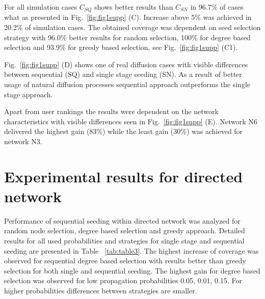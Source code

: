 \documentclass[11pt]{article} %
\begin{document}
For all simulation cases $C_{SQ}$ shows better results than $C_{SN}$ in 96.7\% of cases what as presented in Fig.~\ref{fig:fig1supp} (C). Increase above 5\% was achieved in 20.2\% of simulation cases. The obtained coverage was  dependent on seed selection strategy with 96.0\% better results for random selection, 100\% for degree based selection and 93.9\% for greedy based selection, see Fig.~\ref{fig:fig1supp} (C1). 

Fig.~\ref{fig:fig1supp} (D) shows one of real diffusion cases with visible differences between sequential (SQ) and single stage seeding (SN). As a result of better usage of natural diffusion processes sequential approach  outperforms the single stage approach.

Apart from user rankings the results were dependent on the network characteristics with visible differences seen in Fig.~\ref{fig:fig1supp} (E). Network N6 delivered the highest gain (83\%) while the least gain (30\%) was achieved for network N3.

\section*{Experimental results for directed network}

Performance of sequential seeding within directed network was analyzed for random node selection, degree based selection and greedy approach. Detailed results for all used probabilities and strategies for single stage and sequential seeding are presented in Table ~\ref{tab:table3}. The highest increase of coverage was observed for sequential degree based selection with results better than greedy selection for both single and sequential seeding. The highest gain for degree based selection was observed for low propagation probabilities 0.05, 0.01, 0.15. For higher probabilities differences between strategies are smaller. 
\end{document}
